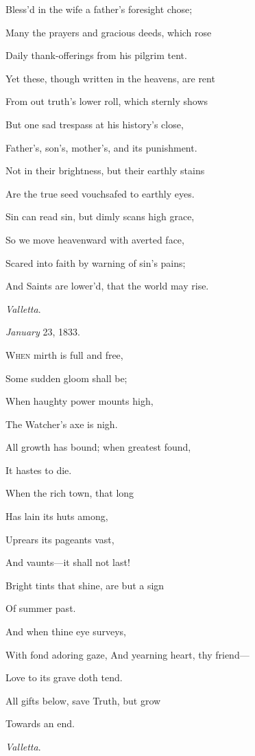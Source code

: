 Bless'd in the wife a father's foresight
chose;

Many the prayers and gracious deeds, which
rose

Daily thank-offerings from his pilgrim tent.

Yet these, though written in the heavens, are rent

From out truth's lower roll, which sternly
shows

But one sad trespass at his history's
close,

Father's, son's, mother's, and its punishment.

Not in their brightness, but their earthly stains

Are the true seed vouchsafed to earthly eyes.

Sin can read sin, but dimly scans high grace,

So we move heavenward with averted face,

Scared into faith by warning of sin's pains;

And Saints are lower'd, that the world may rise.

\emph{Valletta}.

\emph{January} 23, 1833.


W\textsc{hen} mirth is full and free,

Some sudden gloom shall be;

When haughty power mounts high,

The Watcher's axe is nigh.

All growth has bound; when greatest found,

It hastes to die.

When the rich town, that long

Has lain its huts among,

Uprears its pageants vast,

And vaunts—it shall not last!

Bright tints that shine, are but a sign

Of summer past.

And when thine eye surveys,

With fond adoring gaze, And yearning heart, thy friend—

Love to its grave doth tend.

All gifts below, save Truth, but grow

Towards an end.

\emph{Valletta}.

